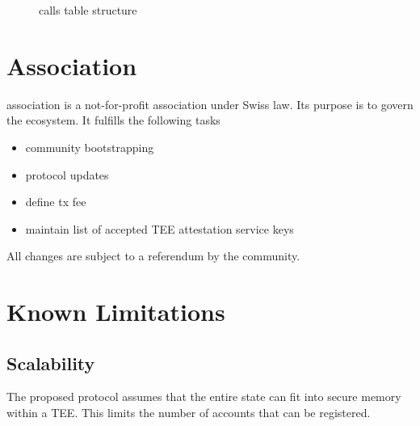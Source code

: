 \documentclass[conference]{IEEEtran}
\begin{document}
\begin{figure}
	\centering
	\def\svgwidth{\columnwidth}
	
	\caption{calls table structure}
	\label{fig:callstable}
\end{figure}



\section{\encointer Association}
\encointer association is a not-for-profit association under Swiss law. Its purpose is to govern the \encointer ecosystem. It fulfills the following tasks
\begin{itemize}
	\item community bootstrapping
	\item protocol updates
	\item define tx fee
	\item maintain list of accepted TEE attestation service keys
\end{itemize}
All changes are subject to a referendum by the community.

\section{Known Limitations}
\subsection{Scalability}
The proposed \encointer protocol assumes that the entire state can fit into secure memory within a TEE. This limits the number of accounts that can be registered. 
\end{document}
